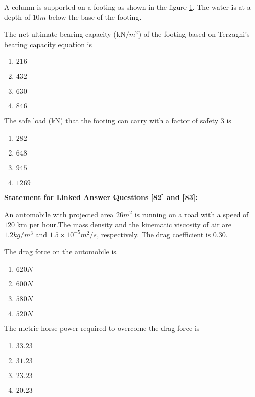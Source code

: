     A column is supported on a footing as shown in the figure \ref{80-81}. The water is at a depth of $10m$ below the base of the footing.
    \begin{figure}[H]
        \centering
        
        \caption{}
        \label{80-81}
    \end{figure}
    \item \label{80} The net ultimate bearing capacity (kN$/m^2$) of the footing based on Terzaghi's bearing capacity equation is
        \begin{enumerate}
            \item $216$
            \item $432$
            \item $630$
            \item $846$
        \end{enumerate}

    \item \label{81} The safe load (kN) that the footing can carry with a factor of safety $3$ is 
        \begin{enumerate}
            \item $282$
            \item $648$
            \item $945$
            \item $1269$
        \end{enumerate}

    \item[] \textbf{Statement for Linked Answer Questions \ref{82} and \ref{83}:}

    An automobile with projected area $26m^2$ is running on a road with a speed of $120$ km per hour.The mass density and the kinematic viscosity of air are $1.2 kg/m^3$ and $1.5\times 10^{-5} m^2/s$, respectively. The drag coefficient is $0.30$.
    \item \label{82} The drag force on the automobile is
        \begin{enumerate}
            \item $620N$
            \item $600N$
            \item $580N$
            \item $520N$
        \end{enumerate}

    \item \label{83} The metric horse power required to overcome the drag force is 
        \begin{enumerate}
            \item $33.23$
            \item $31.23$
            \item $23.23$
            \item $20.23$
        \end{enumerate}

